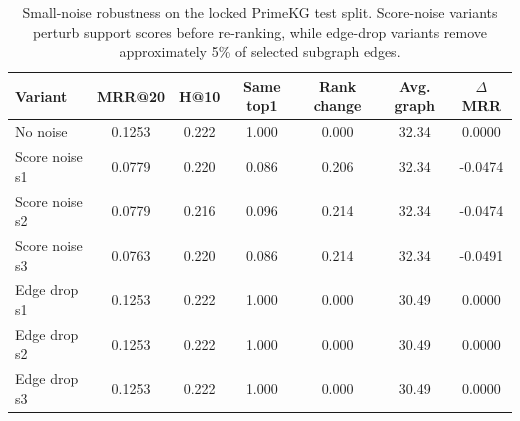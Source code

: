 \begin{table}[t]
\centering
\small
\caption{Small-noise robustness on the locked PrimeKG test split. Score-noise variants perturb support scores before re-ranking, while edge-drop variants remove approximately 5\% of selected subgraph edges.}
\label{tab:noise-robustness}
\begin{tabular}{lcccccc}
\toprule
Variant & MRR@20 & H@10 & Same top1 & Rank change & Avg. graph & $\Delta$MRR \\
\midrule
No noise & 0.1253 & 0.222 & 1.000 & 0.000 & 32.34 & 0.0000 \\
Score noise s1 & 0.0779 & 0.220 & 0.086 & 0.206 & 32.34 & -0.0474 \\
Score noise s2 & 0.0779 & 0.216 & 0.096 & 0.214 & 32.34 & -0.0474 \\
Score noise s3 & 0.0763 & 0.220 & 0.086 & 0.214 & 32.34 & -0.0491 \\
Edge drop s1 & 0.1253 & 0.222 & 1.000 & 0.000 & 30.49 & 0.0000 \\
Edge drop s2 & 0.1253 & 0.222 & 1.000 & 0.000 & 30.49 & 0.0000 \\
Edge drop s3 & 0.1253 & 0.222 & 1.000 & 0.000 & 30.49 & 0.0000 \\
\bottomrule
\end{tabular}
\end{table}
